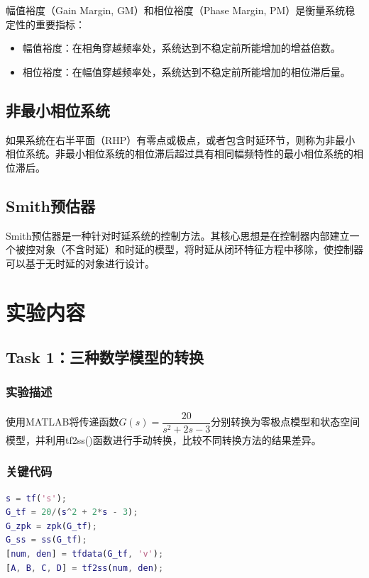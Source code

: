 \documentclass{../common/SCNU_Experimental_Report}
\begin{document}
幅值裕度（Gain Margin, GM）和相位裕度（Phase Margin, PM）是衡量系统稳定性的重要指标：
\begin{itemize}
    \item 幅值裕度：在相角穿越频率处，系统达到不稳定前所能增加的增益倍数。
    \item 相位裕度：在幅值穿越频率处，系统达到不稳定前所能增加的相位滞后量。
\end{itemize}

\subsection{非最小相位系统}
如果系统在右半平面（RHP）有零点或极点，或者包含时延环节，则称为非最小相位系统。非最小相位系统的相位滞后超过具有相同幅频特性的最小相位系统的相位滞后。

\subsection{Smith预估器}
Smith预估器是一种针对时延系统的控制方法。其核心思想是在控制器内部建立一个被控对象（不含时延）和时延的模型，将时延从闭环特征方程中移除，使控制器可以基于无时延的对象进行设计。

\section{实验内容}

\subsection{Task 1：三种数学模型的转换}
\subsubsection{实验描述}
使用MATLAB将传递函数$G(s) = \dfrac{20}{s^2 + 2s - 3}$分别转换为零极点模型和状态空间模型，并利用tf2ss()函数进行手动转换，比较不同转换方法的结果差异。

\subsubsection{关键代码}
\begin{lstlisting}[language=Matlab, caption=Task 1 核心代码]
s = tf('s');
G_tf = 20/(s^2 + 2*s - 3);
G_zpk = zpk(G_tf);
G_ss = ss(G_tf);
[num, den] = tfdata(G_tf, 'v');
[A, B, C, D] = tf2ss(num, den);
\end{lstlisting}
\end{document}
